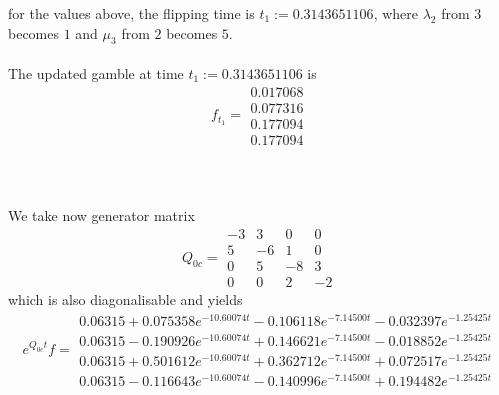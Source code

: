 \documentclass{article}
\begin{document}
for the values above, the flipping time is $t_{1}:= 0.3143651106$, where $\lambda_{2}$ from $3$ becomes $1$ and $\mu_{3}$ from $2$ becomes $5$.\\\\
The updated gamble at time $t_{1}:= 0.3143651106$ is
\begin{equation*} 
 f_{t_1}= 
 \begin{array}{|c|}
  0.017068\\
  0.077316\\
  0.177094\\
  0.177094  
 \end{array}
 \end{equation*}\\\\\\
We take now generator matrix 
\begin{equation*} 
 Q_{0c}= 
 \begin{array}{|rrrr|}
  -3 & 3 & 0 & 0 \\
  5 & -6 & 1 & 0 \\
  0 & 5 & -8 & 3 \\
  0 & 0 & 2 & -2 
 \end{array}
 \end{equation*}
 which is also diagonalisable and yields
\begin{equation*} 
 e^{Q_{0c}t}f= 
 \begin{array}{|r|}
  0.06315+0.075358e^{-10.60074t}- 0.106118e^{-7.14500t}- 0.032397e^{-1.25425t}\\
  0.06315-0.190926e^{-10.60074t}+ 0.146621e^{-7.14500t}- 0.018852e^{-1.25425t}\\
  0.06315+0.501612e^{-10.60074t}+ 0.362712e^{-7.14500t}+ 0.072517e^{-1.25425t}\\
  0.06315-0.116643e^{-10.60074t}- 0.140996e^{-7.14500t}+ 0.194482e^{-1.25425t}  
 \end{array}
 \end{equation*}
\end{document}
